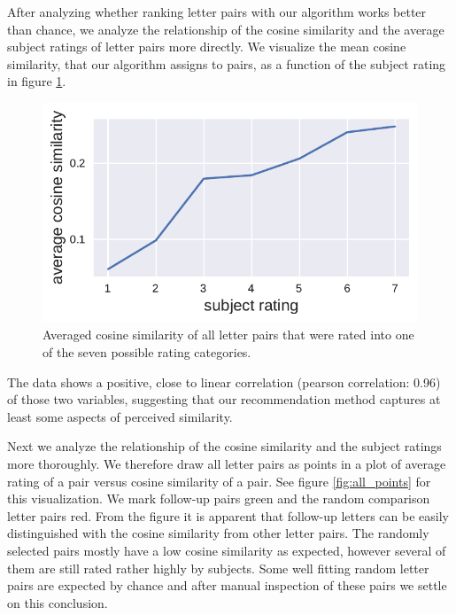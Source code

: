 After analyzing whether ranking letter pairs with our algorithm works better than chance, we analyze the relationship of the cosine similarity and the average subject ratings of letter pairs more directly. We visualize the mean cosine similarity, that our algorithm assigns to pairs, as a function of the subject rating in figure \ref{fig:rating_vs_sim}.
\begin{figure}
	\begin{center}
		\includegraphics[width=0.98\linewidth]{figures/rating_vs_sim_mean}
	\end{center}
	\caption{Averaged cosine similarity of all letter pairs that were rated into one of the seven possible rating categories.}
	\label{fig:rating_vs_sim}
\end{figure} The data shows a positive, close to linear correlation (pearson correlation: 0.96) of those two variables, suggesting that our recommendation method captures at least some aspects of perceived similarity.

%	
%		
Next we analyze the relationship of the cosine similarity and the subject ratings more thoroughly. We therefore draw all letter pairs as points in a plot of average rating of a pair versus cosine similarity of a pair. See figure \ref{fig:all_points} for this visualization. We mark follow-up pairs green and the random comparison letter pairs red. From the figure it is apparent that follow-up letters can be easily distinguished with the cosine similarity from other letter pairs. The randomly selected pairs mostly have a low cosine similarity as expected, however several of them are still rated rather highly by subjects. Some well fitting random letter pairs are expected by chance and after manual inspection of these pairs we settle on this conclusion.




